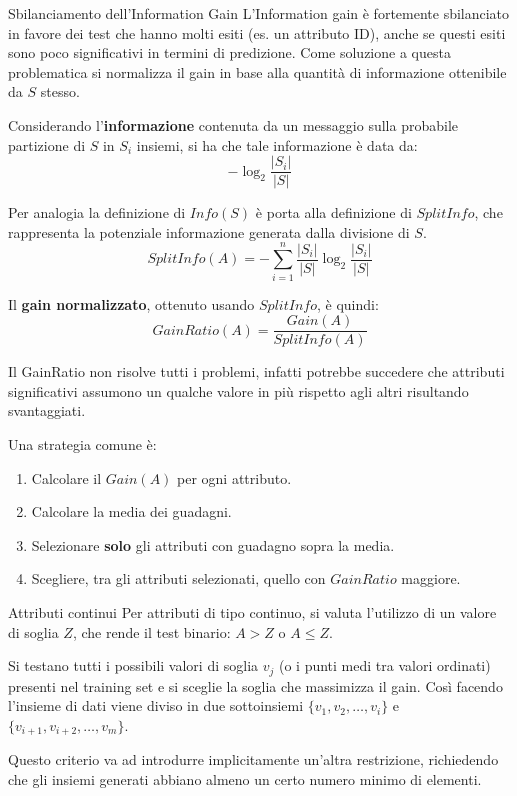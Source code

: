 \begin{nota}{Sbilanciamento dell'Information Gain}{}
L'Information gain è fortemente sbilanciato in favore dei test che hanno molti
esiti (es. un attributo ID), anche se questi esiti sono poco significativi
in termini di predizione.
Come soluzione a questa problematica si normalizza il gain in base alla
quantità di informazione ottenibile da $S$ stesso.

Considerando l'\textbf{informazione} contenuta da un messaggio sulla probabile
partizione di $S$ in $S_i$ insiemi, si ha che tale informazione è data da:
\[
-\log_{2}\frac{|S_{i}|}{|S|}
\]

Per analogia la definizione di $Info(S)$ è porta alla definizione di
$SplitInfo$, che rappresenta la potenziale informazione generata dalla
divisione di $S$.
\[
SplitInfo(A) = -\sum_{i=1}^{n}\frac{|S_{i}|}{|S|}\log_{2}\frac{|S_{i}|}{|S|}
\]

Il \textbf{gain normalizzato}, ottenuto usando $SplitInfo$, è quindi:
\[
GainRatio(A) = \frac{Gain(A)}{SplitInfo(A)}
\]

Il GainRatio non risolve tutti i problemi, infatti potrebbe succedere che
attributi significativi assumono un qualche valore in più rispetto agli altri
risultando svantaggiati.

Una strategia comune è:
\begin{enumerate}
    \item Calcolare il $Gain(A)$ per ogni attributo.
    \item Calcolare la media dei guadagni.
    \item Selezionare \textbf{solo} gli attributi con guadagno sopra la media.
    \item Scegliere, tra gli attributi selezionati, quello con $GainRatio$ maggiore.
\end{enumerate}

\end{nota}


\begin{nota}{Attributi continui}{}
Per attributi di tipo continuo, si valuta l'utilizzo di un valore di soglia
$Z$, che rende il test binario: $A > Z$ o $A \le Z$.

Si testano tutti i possibili valori di soglia $v_j$ (o i punti medi tra valori
ordinati) presenti nel training set e si sceglie la soglia che massimizza il
gain.
Così facendo l'insieme di dati viene diviso in due sottoinsiemi $\{v_1, v_2,
\ldots, v_i\}$ e $\{v_{i+1}, v_{i+2}, \ldots, v_m\}$.

Questo criterio va ad introdurre implicitamente un'altra restrizione, richiedendo
che gli insiemi generati abbiano almeno un certo numero minimo di elementi.
\end{nota}

